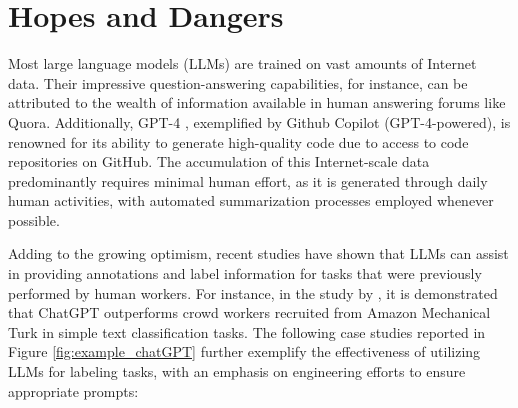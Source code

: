 \documentclass{article}
\begin{document}




\section{Hopes and Dangers}

Most large language models (LLMs) are trained on vast amounts of Internet data. Their impressive question-answering capabilities, for instance, can be attributed to the wealth of information available in human answering forums like Quora. Additionally, GPT-4 \cite{gpt4}, exemplified by Github Copilot (GPT-4-powered), is renowned for its ability to generate high-quality code due to access to code repositories on GitHub. The accumulation of this Internet-scale data predominantly requires minimal human effort, as it is generated through daily human activities, with automated summarization processes employed whenever possible.

Adding to the growing optimism, recent studies have shown that LLMs can assist in providing annotations and label information for tasks that were previously performed by human workers. For instance, in the study by \cite{gilardi2023chatgpt}, it is demonstrated that ChatGPT outperforms crowd workers recruited from Amazon Mechanical Turk in simple text classification tasks. The following case studies reported in Figure \ref{fig:example_chatGPT} further exemplify the effectiveness of utilizing LLMs for labeling tasks, with an emphasis on engineering efforts to ensure appropriate prompts:



\end{document}
